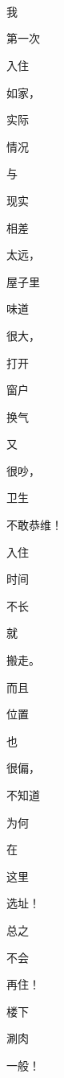 \documentclass[varwidth]{standalone}
\begin{document}
\begin{CJK*}{UTF8}{gbsn}
{{{\\
\\
\\
\colorbox{red!0.0}{\strut \Large{我}} \colorbox{red!29.961070620208424}{\strut \Large{第一次}} \colorbox{red!48.947341851797866}{\strut \Large{入住}} \colorbox{red!41.14011899190218}{\strut \Large{如家，}} \colorbox{red!40.13125117788894}{\strut \Large{实际}} \colorbox{red!54.97649819446319}{\strut \Large{情况}} \colorbox{red!50.362162033702525}{\strut \Large{与}} \colorbox{red!52.27717910319237}{\strut \Large{现实}} \colorbox{red!38.60152159937418}{\strut \Large{相差}} \colorbox{red!41.658937504586774}{\strut \Large{太远，}} \colorbox{red!42.94109401200807}{\strut \Large{屋子里}} \colorbox{red!39.15165680312017}{\strut \Large{味道}} \colorbox{red!26.85724317188363}{\strut \Large{很大，}} \colorbox{red!10.596322737033645}{\strut \Large{打开}} \colorbox{red!17.887783495457057}{\strut \Large{窗户}} \colorbox{red!18.953369421139683}{\strut \Large{换气}} \colorbox{red!27.16034151702958}{\strut \Large{又}} \colorbox{red!55.82755679022402}{\strut \Large{很吵，}} \colorbox{red!80.0}{\strut \Large{卫生}} \colorbox{red!63.968768538503355}{\strut \Large{不敢恭维！}} \colorbox{red!60.41878783686154}{\strut \Large{入住}} \colorbox{red!35.1823438207913}{\strut \Large{时间}} \colorbox{red!36.31062897925379}{\strut \Large{不长}} \colorbox{red!29.720050630218417}{\strut \Large{就}} \colorbox{red!39.53579002614894}{\strut \Large{搬走。}} \colorbox{red!29.649660981414915}{\strut \Large{而且}} \colorbox{red!34.240876976473665}{\strut \Large{位置}} \colorbox{red!34.82384343639396}{\strut \Large{也}} \colorbox{red!47.98119041831078}{\strut \Large{很偏，}} \colorbox{red!43.76886311180597}{\strut \Large{不知道}} \colorbox{red!49.61052570072948}{\strut \Large{为何}} \colorbox{red!55.83423875047061}{\strut \Large{在}} \colorbox{red!55.939971387654325}{\strut \Large{这里}} \colorbox{red!58.83977280441475}{\strut \Large{选址！}} \colorbox{red!51.344505203042694}{\strut \Large{总之}} \colorbox{red!54.88165725596102}{\strut \Large{不会}} \colorbox{red!62.077911134373636}{\strut \Large{再住！}} \colorbox{red!47.48640269184317}{\strut \Large{楼下}} \colorbox{red!46.926065339867655}{\strut \Large{涮肉}} \colorbox{red!53.34290143380752}{\strut \Large{一般！}} 
}}}
\end{CJK*}
\end{document}
